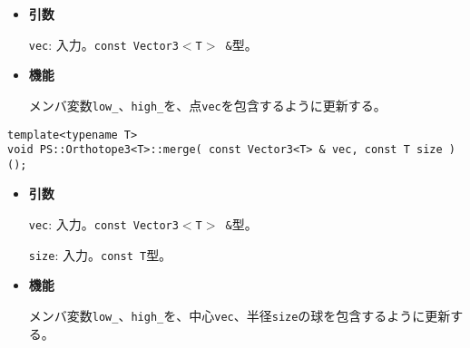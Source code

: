 \begin{itemize}

\item{{\bf 引数}}

\texttt{vec}: 入力。\texttt{const Vector3$<$T$>$ \&}型。

\item{{\bf 機能}}

メンバ変数\texttt{low\_}、\texttt{high\_}を、点\texttt{vec}を包含するように更新する。

\end{itemize}
\begin{screen}
\begin{verbatim}
template<typename T>
void PS::Orthotope3<T>::merge( const Vector3<T> & vec, const T size )();
\end{verbatim}
\end{screen}

\begin{itemize}

\item{{\bf 引数}}

\texttt{vec}: 入力。\texttt{const Vector3$<$T$>$ \&}型。

\texttt{size}: 入力。\texttt{const T}型。

\item{{\bf 機能}}

メンバ変数\texttt{low\_}、\texttt{high\_}を、中心\texttt{vec}、半径\texttt{size}の球を包含するように更新する。

\end{itemize}

